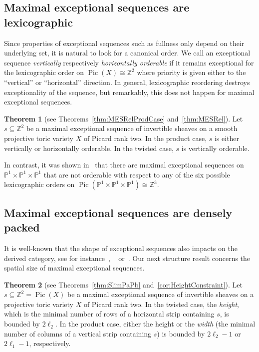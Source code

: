 \documentclass[11pt]{article}
\theoremstyle{definition}
\numberwithin{equation}{section}
\newcommand{\PP}{\mathbb P}
\newcommand{\Z}{\mathbb Z}
\newcommand{\Pic}{\operatorname{Pic}}
\newcommand{\cl}{s}
\newtheorem{main}{Theorem}
\begin{document}
\subsection{Maximal exceptional sequences are lexicographic}
\label{subsubsec:LexExSeq}
Since properties of exceptional sequences such 
as fullness only depend on their underlying set,
it is natural to look for a canonical order. 
{We call an exceptional sequence 
{\em vertically} respectively 
{\em horizontally orderable} if it remains 
exceptional for the lexicographic order on 
\mbox{$\Pic(X)\cong\Z^2$} where priority is given 
either to the ``vertical'' or ``horizontal'' 
direction. In general, lexicographic 
reordering destroys exceptionality of the 
sequence, but remarkably, this does not 
happen for maximal exceptional sequences.}

  \begin{main}[{see Theorems~\ref{thm:MESRelProdCase} and~\ref{thm:MESRel}}] \label{thm:introA}
 Let $\cl\subseteq\Z^2$ be a maximal 
exceptional sequence of invertible sheaves on 
a smooth projective toric variety $X$ of Picard 
rank two. In the product case, $\cl$ 
is either vertically or horizontally orderable. 
In the twisted case, $\cl$ is vertically orderable.
 \end{main}

In contrast, it was shown in~\cite[Example 3.5]{p1p1p1} 
that there are maximal exceptional sequences on
$\PP^1\times\PP^1\times\PP^1$ {that are not 
orderable with respect to any of the six possible 
lexicographic orders on 
$\Pic(\PP^1\times\PP^1\times\PP^1)\cong\Z^3$}.

\subsection{Maximal exceptional sequences are densely packed}
\label{subsubsec:PropExSeq}
It is well-known that the shape of exceptional 
sequences also impacts on the derived category, 
see for instance~\cite{resCatLMS},
~\cite{resCatCompositio} or~\cite{Mironov}. 
Our next structure result concerns the 
spatial size of maximal exceptional sequences. 

  \begin{main} [{see Theorems~\ref{thm:SlimPaPb} and~\ref{cor:HeightConstraint}}] \label{thm:introB}
Let $\cl\subseteq\Z^2=\Pic(X)$ be a 
maximal exceptional sequence of invertible 
sheaves on a projective toric variety $X$ 
of Picard rank two. In the twisted case, 
the {\em height}, which is the minimal number of rows 
of a horizontal strip containing $\cl$, is bounded by 
$2\ell_2$. In the product case, either the height or 
the {\em width} (the minimal number of columns of a 
vertical strip containing $\cl$) is bounded by $2\ell_2-1$ 
or $2\ell_1-1$, respectively.
 \end{main}
\end{document}
